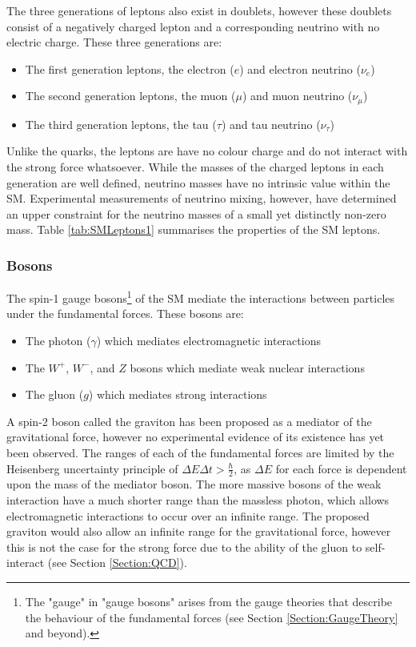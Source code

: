 \documentclass[12pt,a4paper,epsf,portrait,times,epsfig]{report}
\begin{document}
	The three generations of leptons also exist in doublets, however these doublets consist of a negatively charged lepton and a corresponding neutrino with no electric charge. These three generations are:
	
	\begin{itemize}
		\item The first generation leptons, the electron ($e$) and electron neutrino ($\nu_{e}$)
		\item The second generation leptons, the muon ($\mu$) and muon neutrino ($\nu_{\mu}$)
		\item The third generation leptons, the tau ($\tau$) and tau neutrino ($\nu_{\tau}$)
	\end{itemize}

	Unlike the quarks, the leptons are have no colour charge and do not interact with the strong force whatsoever. While the masses of the charged leptons in each generation are well defined, neutrino masses have no intrinsic value within the SM. Experimental measurements of neutrino mixing, however, have determined an upper constraint for the neutrino masses of a small yet distinctly non-zero mass. Table \ref{tab:SMLeptons1} summarises the properties of the SM leptons. 

	\subsubsection{Bosons}
	
	The spin-1 gauge bosons\footnote{The "gauge" in "gauge bosons" arises from the gauge theories that describe the behaviour of the fundamental forces (see Section \ref{Section:GaugeTheory} and beyond).} of the SM mediate the interactions between particles under the fundamental forces. These bosons are:

	\begin{itemize}
		\item The photon ($\gamma$) which mediates electromagnetic interactions
		\item The $W^{+}$, $W^{-}$, and $Z$ bosons which mediate weak nuclear interactions
		\item The gluon ($g$) which mediates strong interactions
	\end{itemize}

	A spin-2 boson called the graviton has been proposed as a mediator of the gravitational force, however no experimental evidence of its existence has yet been observed. The ranges of each of the fundamental forces are limited by the Heisenberg uncertainty principle of $\Delta E \Delta t > \frac{\hbar}{2}$, as $\Delta E$ for each force is dependent upon the mass of the mediator boson. The more massive bosons of the weak interaction have a much shorter range than the massless photon, which allows electromagnetic interactions to occur over an infinite range. The proposed graviton would also allow an infinite range for the gravitational force, however this is not the case for the strong force due to the ability of the gluon to self-interact (see Section \ref{Section:QCD}). \par
\end{document}
